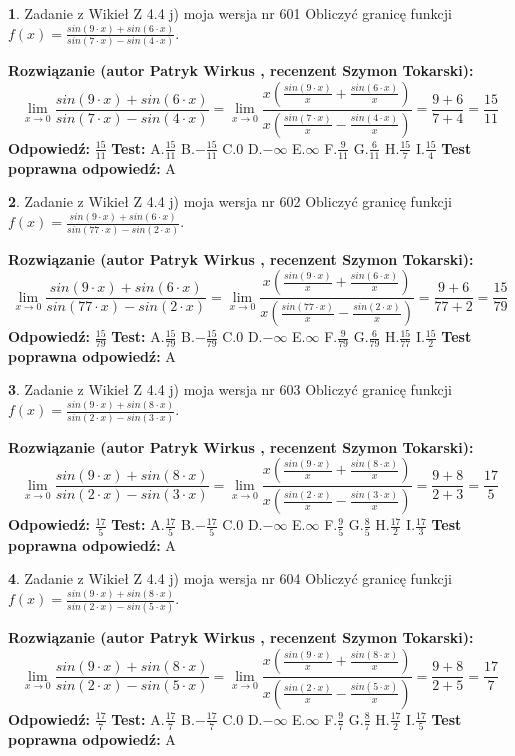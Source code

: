 \documentclass[12pt, a4paper]{article}
\theoremstyle{definition} %
\newtheorem{zad}{}
\newcommand{\zadStart}[1]{\begin{zad}#1\newline}
\newcommand{\zadStop}{\end{zad}}
\newcommand{\rozwStart}[2]{\noindent \textbf{Rozwiązanie (autor #1 , recenzent #2): }\newline}
\newcommand{\rozwStop}{\newline}
\newcommand{\odpStart}{\noindent \textbf{Odpowiedź:}\newline}
\newcommand{\odpStop}{\newline}
\newcommand{\testStart}{\noindent \textbf{Test:}\newline}
\newcommand{\testStop}{\newline}
\newcommand{\kluczStart}{\noindent \textbf{Test poprawna odpowiedź:}\newline}
\newcommand{\kluczStop}{\newline}
\begin{document}
\zadStart{Zadanie z Wikieł Z 4.4 j) moja wersja nr 601}
Obliczyć granicę funkcji $f(x)=\frac{sin(9\cdot x) +sin(6\cdot x)}{sin(7\cdot x) -sin(4\cdot x)}$.
\zadStop
\rozwStart{Patryk Wirkus}{Szymon Tokarski}
$$\lim\limits_{x\to 0}\frac{sin(9\cdot x) +sin(6\cdot x)}{sin(7\cdot x) -sin(4\cdot x)}=\lim\limits_{x\to 0}\frac{x(\frac{sin(9\cdot x)}{x}+\frac{sin(6\cdot x)}{x})}{x(\frac{sin(7\cdot x)}{x}-\frac{sin(4\cdot x)}{x})}=\frac{9+6}{7+4} = \frac{15}{11}$$
\rozwStop
\odpStart
$\frac{15}{11}$
\odpStop
\testStart
A.$\frac{15}{11}$
B.$-\frac{15}{11}$
C.$0$
D.$-\infty$
E.$\infty$
F.$\frac{9}{11}$
G.$\frac{6}{11}$
H.$\frac{15}{7}$
I.$\frac{15}{4}$
\testStop
\kluczStart
A
\kluczStop



\zadStart{Zadanie z Wikieł Z 4.4 j) moja wersja nr 602}
Obliczyć granicę funkcji $f(x)=\frac{sin(9\cdot x) +sin(6\cdot x)}{sin(77\cdot x) -sin(2\cdot x)}$.
\zadStop
\rozwStart{Patryk Wirkus}{Szymon Tokarski}
$$\lim\limits_{x\to 0}\frac{sin(9\cdot x) +sin(6\cdot x)}{sin(77\cdot x) -sin(2\cdot x)}=\lim\limits_{x\to 0}\frac{x(\frac{sin(9\cdot x)}{x}+\frac{sin(6\cdot x)}{x})}{x(\frac{sin(77\cdot x)}{x}-\frac{sin(2\cdot x)}{x})}=\frac{9+6}{77+2} = \frac{15}{79}$$
\rozwStop
\odpStart
$\frac{15}{79}$
\odpStop
\testStart
A.$\frac{15}{79}$
B.$-\frac{15}{79}$
C.$0$
D.$-\infty$
E.$\infty$
F.$\frac{9}{79}$
G.$\frac{6}{79}$
H.$\frac{15}{77}$
I.$\frac{15}{2}$
\testStop
\kluczStart
A
\kluczStop



\zadStart{Zadanie z Wikieł Z 4.4 j) moja wersja nr 603}
Obliczyć granicę funkcji $f(x)=\frac{sin(9\cdot x) +sin(8\cdot x)}{sin(2\cdot x) -sin(3\cdot x)}$.
\zadStop
\rozwStart{Patryk Wirkus}{Szymon Tokarski}
$$\lim\limits_{x\to 0}\frac{sin(9\cdot x) +sin(8\cdot x)}{sin(2\cdot x) -sin(3\cdot x)}=\lim\limits_{x\to 0}\frac{x(\frac{sin(9\cdot x)}{x}+\frac{sin(8\cdot x)}{x})}{x(\frac{sin(2\cdot x)}{x}-\frac{sin(3\cdot x)}{x})}=\frac{9+8}{2+3} = \frac{17}{5}$$
\rozwStop
\odpStart
$\frac{17}{5}$
\odpStop
\testStart
A.$\frac{17}{5}$
B.$-\frac{17}{5}$
C.$0$
D.$-\infty$
E.$\infty$
F.$\frac{9}{5}$
G.$\frac{8}{5}$
H.$\frac{17}{2}$
I.$\frac{17}{3}$
\testStop
\kluczStart
A
\kluczStop



\zadStart{Zadanie z Wikieł Z 4.4 j) moja wersja nr 604}
Obliczyć granicę funkcji $f(x)=\frac{sin(9\cdot x) +sin(8\cdot x)}{sin(2\cdot x) -sin(5\cdot x)}$.
\zadStop
\rozwStart{Patryk Wirkus}{Szymon Tokarski}
$$\lim\limits_{x\to 0}\frac{sin(9\cdot x) +sin(8\cdot x)}{sin(2\cdot x) -sin(5\cdot x)}=\lim\limits_{x\to 0}\frac{x(\frac{sin(9\cdot x)}{x}+\frac{sin(8\cdot x)}{x})}{x(\frac{sin(2\cdot x)}{x}-\frac{sin(5\cdot x)}{x})}=\frac{9+8}{2+5} = \frac{17}{7}$$
\rozwStop
\odpStart
$\frac{17}{7}$
\odpStop
\testStart
A.$\frac{17}{7}$
B.$-\frac{17}{7}$
C.$0$
D.$-\infty$
E.$\infty$
F.$\frac{9}{7}$
G.$\frac{8}{7}$
H.$\frac{17}{2}$
I.$\frac{17}{5}$
\testStop
\kluczStart
A
\kluczStop
\end{document}
